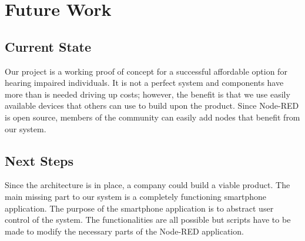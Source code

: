 \chapter{Future Work}

\section{Current State}
Our project is a working proof of concept for a successful affordable option for hearing impaired individuals. It is not  a perfect system and components have more than is needed driving up costs; however, the benefit is that we use easily available devices that others can use to build upon the product. Since Node-RED is open source, members of the community can easily add nodes that benefit from our system.

\section{Next Steps}
Since the architecture is in place, a company could build a viable product. The main missing part to our system is a completely functioning smartphone application. The purpose of the smartphone application is to abstract user control of the system. The functionalities are all possible but scripts have to be made to modify the necessary parts of the Node-RED application.